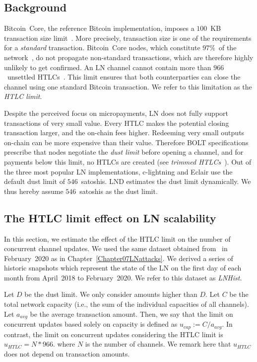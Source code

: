 \subsection{Background} \label{max-htlc-background}

Bitcoin~Core, the reference Bitcoin implementation, imposes a $100$~KB transaction size limit~\cite{StandardTxBitcoinSE, BitcoinCoreMaxTxWeight}.
More precisely, transaction size is one of the requirements for a \textit{standard} transaction.
Bitcoin~Core nodes, which constitute $97\%$~of the network~\cite{CoinDance}, do not propagate non-standard transactions, which are therefore highly unlikely to get confirmed.
An LN channel cannot contain more than $966$~unsettled HTLCs~\cite{BOLT2Rationale}.
This limit ensures that both counterparties can close the channel using one standard Bitcoin transaction.
We refer to this limitation as the \textit{HTLC limit}.

Despite the perceived focus on micropayments, LN does not fully support transactions of very small value.
Every HTLC makes the potential closing transaction larger, and the on-chain fees higher.
Redeeming very small outputs on-chain can be more expensive than their value.
Therefore BOLT specifications prescribe that nodes negotiate the \textit{dust limit} before opening a channel, and for payments below this limit, no HTLCs are created (see \textit{trimmed HTLCs}~\cite{BOLT3Trimmed}).
Out of the three most popular LN implementations, c-lightning and Eclair use the default dust limit of $546$~satoshis.
LND estimates the dust limit dynamically.
We thus hereby assume $546$~satoshis as the dust limit.


\subsection{The HTLC limit effect on LN scalability}	\label{estimating-concurrent channel updates}

In this section, we estimate the effect of the HTLC limit on the number of concurrent channel updates.
We used the same dataset obtained from~\cite{fiatjaf2020} in February~2020 as in Chapter~\ref{Chapter07LNattacks}.
We derived a series of historic snapshots which represent the state of the LN on the first day of each month from April~2018 to February~2020.
We refer to this dataset as \textit{LNHist}.

Let $D$ be the dust limit.
We only consider amounts higher than $D$.
Let $C$ be the total network capacity (i.e., the sum of the individual capacities of all channels).
Let $a_\textit{avg}$ be the average transaction amount.
Then, we say that the limit on concurrent updates based solely on capacity is defined as $u_\textit{cap} := C / a_\textit{avg}$.
In contrast, the limit on concurrent updates considering the HTLC limit is $u_\textit{HTLC} = N * 966$.
where $N$ is the number of channels. We remark here that $u_\textit{HTLC}$ does not depend on transaction amounts.

